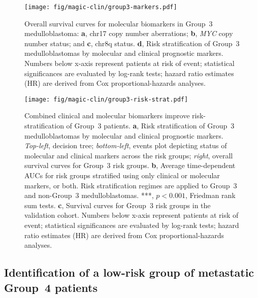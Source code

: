 \documentclass[11pt,letterpaper]{article}
\theoremstyle{definition}
\begin{document}
\begin{figure}[h]
	\begin{center}
		\texttt{[image: fig/magic-clin/group3-markers.pdf]}
	\end{center}
	\caption[Overall survival curves for molecular biomarkers in Group~3 medulloblastoma]
	{
	Overall survival curves for molecular biomarkers in Group~3 medulloblastoma:
	\textbf{a}, chr17 copy number aberrations;
	\textbf{b}, \emph{MYC} copy number status; and 
	\textbf{c}, chr8q status.
	\textbf{d}, Risk stratification of Group~3 medulloblastomas by molecular and clinical prognostic markers.
	Numbers below x-axis represent patients at risk of event; statistical significances are evaluated by log-rank tests; hazard ratio estimates (HR) are derived from Cox proportional-hazards analyses.
	}
	\label{fig:group3-markers}
\end{figure}

\clearpage

\begin{figure}[h]
	\begin{center}
		\texttt{[image: fig/magic-clin/group3-risk-strat.pdf]}
	\end{center}
	\caption[Combined clinical and molecular biomarkers improve risk-stratification of Group~3 patients.]
	{
	Combined clinical and molecular biomarkers improve risk-stratification of Group~3 patients.
	\textbf{a}, Risk stratification of Group~3 medulloblastomas by molecular and clinical prognostic markers.	\emph{Top-left}, decision tree; \emph{bottom-left}, events plot depicting status of molecular and clinical markers across the risk groups; \emph{right}, overall survival curves for Group~3 risk groups.
	\textbf{b}, Average time-dependent AUCs for risk groups stratified using only clinical or molecular markers, or both. Risk stratification regimes are applied to Group~3 and non-Group~3 medulloblastomas. ***, $p < 0.001$, Friedman rank sum tests.
	\textbf{c}, Survival curves for Group~3 risk groups in the validation cohort.
	Numbers below x-axis represent patients at risk of event; statistical significances are evaluated by log-rank tests; hazard ratio estimates (HR) are derived from Cox proportional-hazards analyses.
	}
	\label{fig:group3-risk-strat}
\end{figure}

\clearpage


\subsection{Identification of a low-risk group of metastatic Group~4 patients}
\end{document}
